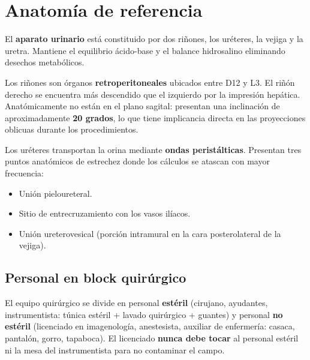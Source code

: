 \vspace{1em}

\section*{Anatomía de referencia}

\begin{cajadefinicion}
El \textbf{aparato urinario} está constituido por dos riñones, los uréteres, la vejiga y la uretra. Mantiene el equilibrio ácido-base y el balance hidrosalino eliminando desechos metabólicos.
\end{cajadefinicion}

Los riñones son órganos \textbf{retroperitoneales} ubicados entre D12 y L3. El riñón derecho se encuentra más descendido que el izquierdo por la impresión hepática. Anatómicamente no están en el plano sagital: presentan una inclinación de aproximadamente \textbf{20 grados}, lo que tiene implicancia directa en las proyecciones oblicuas durante los procedimientos.
\clearpage

Los uréteres transportan la orina mediante \textbf{ondas peristálticas}. Presentan tres puntos anatómicos de estrechez donde los cálculos se atascan con mayor frecuencia:

\begin{itemize}[noitemsep]
  \item Unión pieloureteral.
  \item Sitio de entrecruzamiento con los vasos ilíacos.
  \item Unión ureterovesical (porción intramural en la cara posterolateral de la vejiga).
\end{itemize}

\subsection*{Personal en block quirúrgico}

El equipo quirúrgico se divide en personal \textbf{estéril} (cirujano, ayudantes, instrumentista: túnica estéril + lavado quirúrgico + guantes) y personal \textbf{no estéril} (licenciado en imagenología, anestesista, auxiliar de enfermería: casaca, pantalón, gorro, tapaboca). El licenciado \textbf{nunca debe tocar} al personal estéril ni la mesa del instrumentista para no contaminar el campo.

